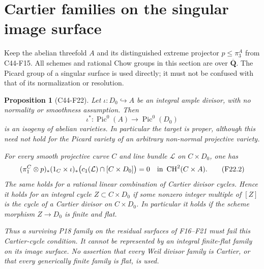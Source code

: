 \documentclass[11pt]{article}
\newtheorem{proposition}[theorem]{Proposition}
\theoremstyle{remark}\newtheorem{remark}[theorem]{Remark}
\begin{document}


\section{Cartier families on the singular image surface}

Keep the abelian threefold $A$ and its distinguished
extreme projector $p\le\pi_3^A$ from C44-F15.
All schemes and rational Chow groups in this section
are over $\overline{\mathbf Q}$.  The Picard group
of a singular surface is used directly; it must
not be confused with that of its normalization
or resolution.

\begin{proposition}[C44-F22]\label{C44-F22}
Let $\iota:D_0\hookrightarrow A$ be an integral
ample divisor, with no normality or smoothness
assumption.  Then
\[
 \iota^*:\operatorname{Pic}^0(A)
                       \longrightarrow\operatorname{Pic}^0(D_0)
 \tag{F22.1}
\]
is an isogeny of abelian varieties.  In particular
the target is proper, although this need not hold
for the Picard variety of an arbitrary non-normal
projective variety.

For every smooth projective curve $C$ and line
bundle $\mathcal L$ on $C\times D_0$, one has
\[
 (\pi_1^C\otimes p)_*(1_C\times\iota)_*
       \bigl(c_1(\mathcal L)\cap[C\times D_0]\bigr)=0
                         \quad\hbox{in }\operatorname{CH}^2(C\times A).
 \tag{F22.2}
\]
The same holds for a rational linear combination
of Cartier divisor cycles.  Hence it holds for
an integral cycle $Z\subset C\times D_0$ if
some nonzero integer multiple of $[Z]$ is the
cycle of a Cartier divisor on $C\times D_0$.
In particular it holds if the scheme morphism
$Z\to D_0$ is finite and flat.

Thus a surviving P18 family on the residual
surfaces of F16--F21 must fail this Cartier-cycle
condition.  It cannot be represented by an
integral finite-flat family on its image surface.
No assertion that every Weil divisor family is
Cartier, or that every generically finite family
is flat, is used.
\end{proposition}
\end{document}
